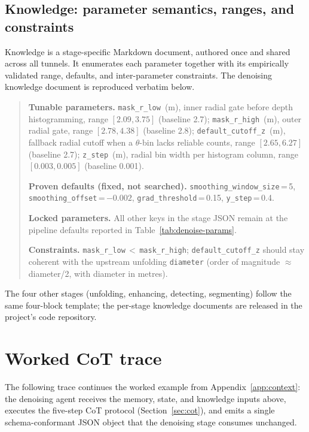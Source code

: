 \subsection{Knowledge: parameter semantics, ranges, and constraints}\label{app:context-knowledge}
Knowledge is a stage-specific Markdown document, authored once and shared across all tunnels. It enumerates each parameter together with its empirically validated range, defaults, and inter-parameter constraints. The denoising knowledge document is reproduced verbatim below.

\begin{quote}\small
\textbf{Tunable parameters.}
\texttt{mask\_r\_low}~(m), inner radial gate before depth histogramming, range $[2.09, 3.75]$ (baseline 2.7);
\texttt{mask\_r\_high}~(m), outer radial gate, range $[2.78, 4.38]$ (baseline 2.8);
\texttt{default\_cutoff\_z}~(m), fallback radial cutoff when a $\theta$-bin lacks reliable counts, range $[2.65, 6.27]$ (baseline 2.7);
\texttt{z\_step}~(m), radial bin width per histogram column, range $[0.003, 0.005]$ (baseline 0.001).

\textbf{Proven defaults (fixed, not searched).}
\texttt{smoothing\_window\_size}\,=\,5,
\texttt{smoothing\_offset}\,=\,$-0.002$,
\texttt{grad\_threshold}\,=\,0.15,
\texttt{y\_step}\,=\,0.4.

\textbf{Locked parameters.} All other keys in the stage JSON remain at the pipeline defaults reported in Table~\ref{tab:denoise-params}.

\textbf{Constraints.}
\texttt{mask\_r\_low}\,$<$\,\texttt{mask\_r\_high};
\texttt{default\_cutoff\_z} should stay coherent with the upstream unfolding \texttt{diameter} (order of magnitude $\approx$ diameter/2, with diameter in metres).
\end{quote}

The four other stages (unfolding, enhancing, detecting, segmenting) follow the same four-block template; the per-stage knowledge documents are released in the project's code repository.

\section{Worked CoT trace}\label{app:cot}

The following trace continues the worked example from Appendix~\ref{app:context}: the denoising agent receives the memory, state, and knowledge inputs above, executes the five-step CoT protocol (Section~\ref{sec:cot}), and emits a single schema-conformant JSON object that the denoising stage consumes unchanged.

